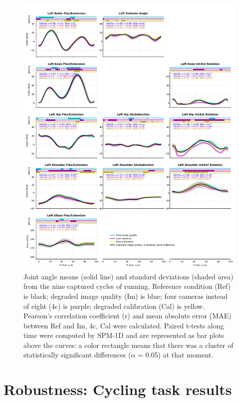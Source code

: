 \begin{figure}[!ht]
	\centering
	\def\svgwidth{1\columnwidth}
	\fontsize{10pt}{10pt}\selectfont
	\includegraphics[height=\dimexpr\textheight-145pt]{"../Annexes/Figures/Fig_RunRobust.png"}
	\caption{Joint angle means (solid line) and standard deviations (shaded area) from the nine captured cycles of running. Reference condition (Ref) is black; degraded image quality (Im) is blue; four cameras instead of eight (4c) is purple; degraded calibration (Cal) is yellow. Pearson’s correlation coefficient (r) and mean absolute error (MAE) between Ref and Im, 4c, Cal were calculated. Paired t-tests along time were computed by SPM-1D and are represented as bar plots above the curves: a color rectangle means that there was a cluster of statistically significant differences (\(\alpha\) = 0.05) at that moment.}
	\label{fig_runrobust}
\end{figure}

\clearpage
\section{Robustness: Cycling task results}


